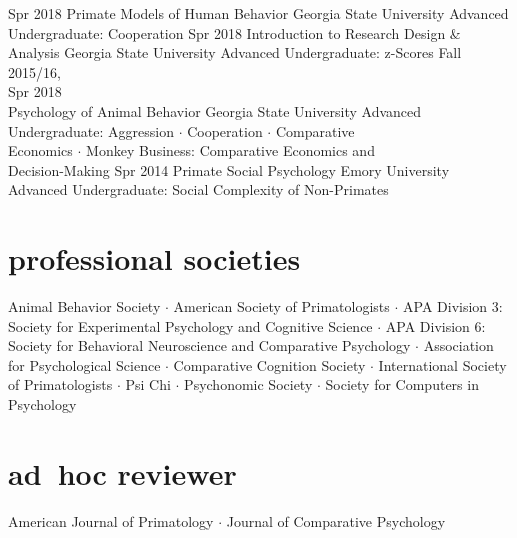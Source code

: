 \documentclass[]{friggeri-cv}
\begin{document}
\begin{entrylist}
  \entry
    {Spr 2018}
    {Primate Models of Human Behavior}
    {Georgia State University}
    {Advanced Undergraduate: Cooperation}
  \entry
    {Spr 2018}
    {Introduction to Research Design \& Analysis}
    {Georgia State University}
    {Advanced Undergraduate: z-Scores}
  \entry
    {Fall 2015/16,\\Spr 2018\\[-.85cm]}
    {Psychology of Animal Behavior}
    {Georgia State University}
    {Advanced Undergraduate: Aggression $\cdot$ Cooperation $\cdot$ Comparative \\
    Economics $\cdot$ Monkey Business: Comparative Economics and \\
    Decision-Making}
  \entry
    {Spr 2014}
    {Primate Social Psychology}
    {Emory University}
    {Advanced Undergraduate: Social Complexity of Non-Primates}
\end{entrylist}


\section{professional societies}
    Animal Behavior Society $\cdot$ %
    American Society of Primatologists $\cdot$ %
    APA Division 3: Society for Experimental Psychology and Cognitive Science $\cdot$ %
    APA Division 6: Society for Behavioral Neuroscience and Comparative Psychology $\cdot$ %
    Association for Psychological Science $\cdot$ %
    Comparative Cognition Society $\cdot$ %
    International Society of Primatologists $\cdot$ %
    Psi Chi $\cdot$ %
    Psychonomic Society $\cdot$ %
    Society for Computers in Psychology \\[.5cm]


\section{ad~hoc reviewer}
    American Journal of Primatology $\cdot$ Journal of Comparative Psychology \\[.5cm]
\end{document}
